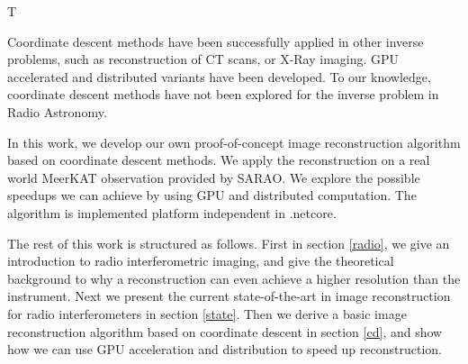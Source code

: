 T

Coordinate descent methods have been successfully applied in other inverse problems, such as reconstruction of CT scans\cite{bouman1996unified}, or X-Ray imaging\cite{felix2017compressed}. GPU accelerated\cite{mcgaffin2015edge} and distributed\cite{fercoq2014fast} variants have been developed. To our knowledge, coordinate descent methods have not been explored for the inverse problem in Radio Astronomy.

In this work, we develop our own proof-of-concept image reconstruction algorithm based on coordinate descent methods. We apply the reconstruction on a real world MeerKAT observation provided by SARAO. We explore the possible speedups we can achieve by using GPU and distributed computation. The algorithm is implemented platform independent in .netcore.


The rest of this work is structured as follows. First in section \ref{radio}, we give an introduction to radio interferometric imaging, and give the theoretical background to why a reconstruction can even achieve a higher resolution than the instrument. Next we present the current state-of-the-art in image reconstruction for radio interferometers in section \ref{state}. Then we derive a basic image reconstruction algorithm based on coordinate descent in section \ref{cd}, and show how we can use GPU acceleration and distribution to speed up reconstruction.

